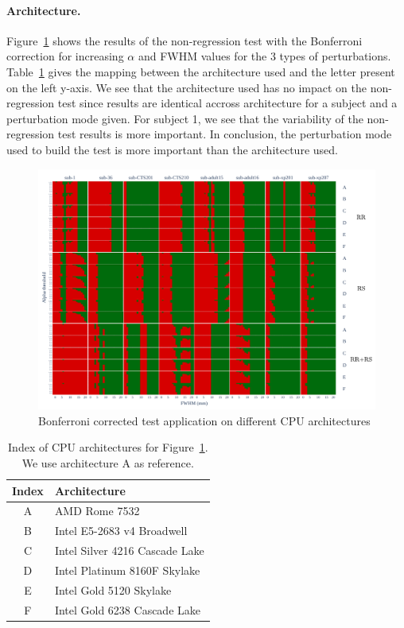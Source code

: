 \documentclass{article}
\begin{document}
\paragraph*{Architecture.} Figure~\ref{fig:arch_bonferroni} shows the results of
the non-regression test with the Bonferroni correction for increasing $\alpha$
and FWHM values for the 3 types of perturbations. Table~\ref{tab:index-arch-map}
gives the mapping between the architecture used and the letter present on the
left y-axis. We see that the architecture used has no impact on the
non-regression test since results are identical accross architecture for a
subject and a perturbation mode given. For subject 1, we see that the
variability of the non-regression test results is more important. In conclusion,
the perturbation mode used to build the test is more important than the
architecture used.


\begin{figure}
    \centering
    \includegraphics[width=\linewidth]{figures/arch/arch_mct_fwe_bonferroni_.pdf}
    \caption{Bonferroni corrected test application on different CPU architectures}
    \label{fig:arch_bonferroni}
\end{figure}

\begin{table}
    \begin{center}
        \begin{tabular}{c|l}
            Index & Architecture                   \\
            \hline
            A     & AMD Rome 7532                  \\
            B     & Intel E5-2683 v4 Broadwell     \\
            C     & Intel Silver 4216 Cascade Lake \\
            D     & Intel Platinum 8160F Skylake   \\
            E     & Intel Gold 5120 Skylake        \\
            F     & Intel Gold 6238 Cascade Lake
        \end{tabular}
    \end{center}
    \caption{Index of CPU architectures for Figure~\ref{fig:arch_bonferroni}. We use architecture A as reference.}
    \label{tab:index-arch-map}
\end{table}
\end{document}
